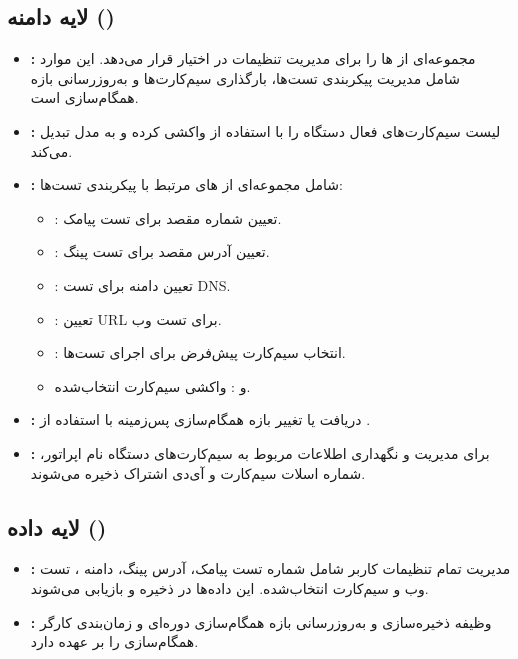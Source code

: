 \subsection{لایه دامنه ()}
\begin{itemize}
    \item \textbf{:}  
    مجموعه‌ای از ‌ها را برای مدیریت تنظیمات در اختیار  قرار می‌دهد. این موارد شامل مدیریت پیکربندی تست‌ها، بارگذاری سیم‌کارت‌ها و به‌روزرسانی بازه همگام‌سازی است.

    \item \textbf{:}  
    لیست سیم‌کارت‌های فعال دستگاه را با استفاده از  واکشی کرده و به مدل  تبدیل می‌کند.

    \item \textbf{:}  
    شامل مجموعه‌ای از ‌های مرتبط با پیکربندی تست‌ها: 
    \begin{itemize}
    \item  {}: تعیین شماره مقصد برای تست پیامک.  
    \item  {}: تعیین آدرس مقصد برای تست پینگ.  
    \item  {}: تعیین دامنه برای تست DNS.  
    \item  {}: تعیین URL برای تست وب.  
    \item  {}: انتخاب سیم‌کارت پیش‌فرض برای اجرای تست‌ها.  
    \item  {} و : واکشی سیم‌کارت انتخاب‌شده.
    \end{itemize}

    \item \textbf{:}  
    دریافت یا تغییر بازه همگام‌سازی پس‌زمینه با استفاده از .

    \item \textbf{:}
    برای  مدیریت و نگهداری اطلاعات مربوط به سیم‌کارت‌های دستگاه نام اپراتور، شماره اسلات سیم‌کارت و آی‌دی اشتراک ذخیره می‌شوند.
\end{itemize}

\subsection{لایه داده ()}
\begin{itemize}
    \item \textbf{:}  
    مدیریت تمام تنظیمات کاربر شامل شماره تست پیامک، آدرس پینگ، دامنه ،  تست وب و سیم‌کارت انتخاب‌شده. این داده‌ها در  ذخیره و بازیابی می‌شوند.

    \item \textbf{:}  
    وظیفه ذخیره‌سازی و به‌روزرسانی بازه همگام‌سازی دوره‌ای و زمان‌بندی کارگر همگام‌سازی را بر عهده دارد.
\end{itemize}

